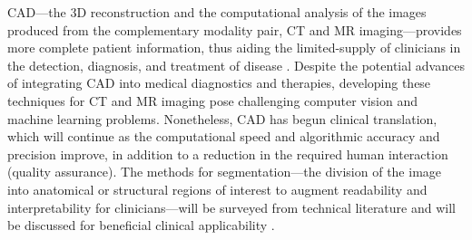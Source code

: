 \documentclass{bmcart}
\begin{document}
\par CAD---the 3D reconstruction and the computational analysis of the images produced from the complementary modality pair, CT and MR imaging---provides more complete patient information, thus aiding the limited-supply of clinicians in the detection, diagnosis, and treatment of disease \cite{van_ginneken_computer-aided_2011}. Despite the potential advances of integrating CAD into medical diagnostics and therapies, developing these techniques for CT and MR imaging pose challenging computer vision and machine learning problems. Nonetheless, CAD has begun clinical translation, which will continue as the computational speed and algorithmic accuracy and precision improve, in addition to a reduction in the required human interaction (quality assurance). The methods for segmentation---the division of the image into anatomical or structural regions of interest to augment readability and interpretability for clinicians---will be surveyed from technical literature and will be discussed for beneficial clinical applicability \cite{van_ginneken_computer-aided_2011}.
\end{document}
